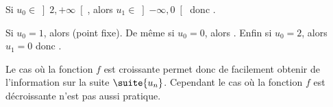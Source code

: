 \documentclass[a4paper,french,bookmarks]{article}
\begin{document}
\begin{example}{}{}
\begin{enumerate}
\begin{enumerate}
            \itstar Si $u_0 \in \left]2, +\infty\right[$, alors $u_1 \in \left]-\infty, 0\right[$ donc .
            
            \itstar Si $u_0 = 1$,  alors  (point fixe). De même si $u_0 = 0$, alors . Enfin si $u_0 = 2$, alors $u_1 = 0$ donc .
        \end{enumerate}
        
        
    \end{enumerate}
\end{example}

Le cas où la fonction $f$ est croissante permet donc de facilement obtenir  de l'information sur la suite $\suite{u_n}$. Cependant le cas où la fonction $f$ est décroissante n'est pas aussi pratique.\\
\end{document}
